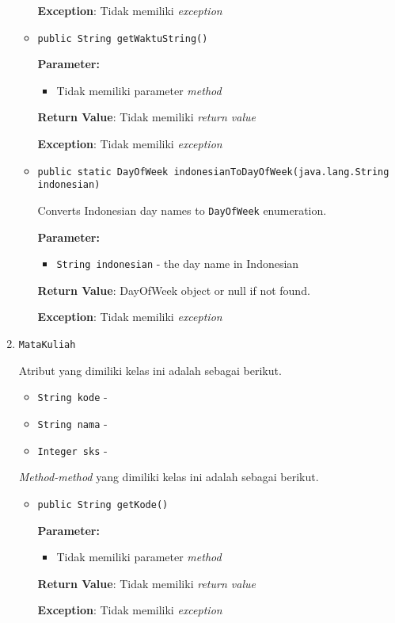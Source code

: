 \documentclass{article}
\begin{document}
\begin{enumerate}
\begin{itemize}
\textbf{Exception}: Tidak memiliki \textit{exception}

\item \texttt{public String getWaktuString()}



\textbf{Parameter:}
\begin{itemize}
\item Tidak memiliki parameter \textit{method}
\end{itemize}
\textbf{Return Value}: Tidak memiliki \textit{return value}

\textbf{Exception}: Tidak memiliki \textit{exception}

\item \texttt{public static DayOfWeek indonesianToDayOfWeek(java.lang.String indonesian)}

Converts Indonesian day names to \texttt{DayOfWeek} enumeration.

\textbf{Parameter:}
\begin{itemize}
\item \texttt{String indonesian} - 
the day name in Indonesian
\end{itemize}
\textbf{Return Value}: DayOfWeek object or null if not found.

\textbf{Exception}: Tidak memiliki \textit{exception}

\end{itemize}
\item \texttt{MataKuliah}



Atribut yang dimiliki kelas ini adalah sebagai berikut.
\begin{itemize}
\item \texttt{String kode} - 
\item \texttt{String nama} - 
\item \texttt{Integer sks} - 
\end{itemize}
\textit{Method-method} yang dimiliki kelas ini adalah sebagai berikut.
\begin{itemize}
\item \texttt{public String getKode()}



\textbf{Parameter:}
\begin{itemize}
\item Tidak memiliki parameter \textit{method}
\end{itemize}
\textbf{Return Value}: Tidak memiliki \textit{return value}

\textbf{Exception}: Tidak memiliki \textit{exception}


\end{itemize}
\end{enumerate}
\end{document}
